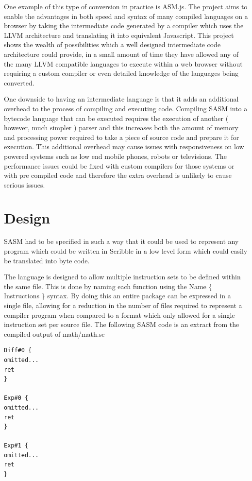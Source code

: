 \documentclass[]{final_report}
\begin{document}
One example of this type of conversion in practice is ASM.js. The project aims to enable the advantages in both speed and syntax of many compiled languages on a browser by taking the intermediate code generated by a compiler which uses the LLVM architecture and translating it into equivalent Javascript. This project shows the wealth of possibilities which a well designed intermediate code architecture could provide, in a small amount of time they have allowed any of the many LLVM compatible languages to execute within a web browser without requiring a custom compiler or even detailed knowledge of the languages being converted.

One downside to having an intermediate language is that it adds an additional overhead to the process of compiling and executing code. Compiling SASM into a bytecode language that can be executed requires the execution of another ( however, much simpler ) parser and this increases both the amount of memory and processing power required to take a piece of source code and prepare it for execution. This additional overhead may cause issues with responsiveness on low powered systems such as low end mobile phones, robots or televisions. The performance issues could be fixed with custom compilers for those systems or with pre compiled code and therefore the extra overhead is unlikely to cause serious issues.

\section{Design}

SASM had to be specified in such a way that it could be used to represent any program which could be written in Scribble in a low level form which could easily be translated into byte code.

The language is designed to allow multiple instruction sets to be defined within the same file. This is done by naming each function using the Name \{ Instructions \} syntax. By doing this an entire package can be expressed in a single file, allowing for a reduction in the number of files required to represent a compiler program when compared to a format which only allowed for a single instruction set per source file. The following SASM code is an extract from the compiled output of math/math.sc

\begin{verbatim}
Diff#0 {
omitted...
ret
}

Exp#0 {
omitted...
ret
}

Exp#1 {
omitted...
ret
}
\end{verbatim}
\end{document}
